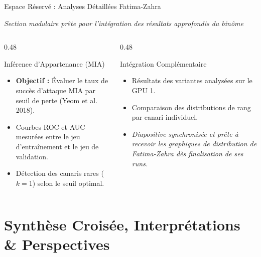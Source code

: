 \documentclass[aspectratio=169, 10pt, table]{beamer}
\newcommand{\subtitleline}[1]{{\small\itshape\color{TSPcyan}#1\par}\vspace{0.15cm}}
\begin{document}
\begin{frame}{Espace Réservé : Analyses Détaillées Fatima-Zahra}
    \subtitleline{Section modulaire prête pour l'intégration des résultats approfondis du binôme}
    \begin{columns}[T]
        \begin{column}{0.48\textwidth}
            \begin{block}{Inférence d'Appartenance (MIA)}
                \begin{itemize}
                    \item \textbf{Objectif :} Évaluer le taux de succès d'attaque MIA par seuil de perte (Yeom et al. 2018).
                    \item Courbes ROC et AUC mesurées entre le jeu d'entraînement et le jeu de validation.
                    \item Détection des canaris rares ($k=1$) selon le seuil optimal.
                \end{itemize}
            \end{block}
        \end{column}
        \begin{column}{0.48\textwidth}
            \begin{block}{Intégration Complémentaire}
                \begin{itemize}
                    \item Résultats des variantes analysées sur le GPU 1.
                    \item Comparaison des distributions de rang par canari individuel.
                    \item \textit{Diapositive synchronisée et prête à recevoir les graphiques de distribution de Fatima-Zahra dès finalisation de ses runs.}
                \end{itemize}
            \end{block}
        \end{column}
    \end{columns}
\end{frame}

\section{Synthèse Croisée, Interprétations \& Perspectives}
\end{document}
